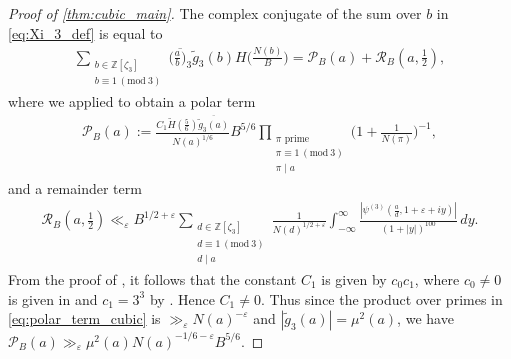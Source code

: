 \documentclass[12pt,reqno]{amsart}
\numberwithin{equation}{section}
\renewcommand{\pmod}[1]{\, (\mathrm{mod}\ #1)}
\newcommand{\Z}{\mathbb{Z}}
\begin{document}
\begin{proof}[Proof of \cref{thm:cubic_main}]
    The complex conjugate of the sum over $b$ in \eqref{eq:Xi_3_def} is equal to
    \begin{align}\label{eq:b_sum_cubic}
        \sum_{\substack{ b \in \mathbb{Z}[\zeta_3] \\ b \equiv 1 \pmod{3}}}  \overline{\Big(\frac{a}{b}\Big)_3} \widetilde{g}_3(b) H\Big(\frac{N(b)}{B}\Big) =  \mathcal{P}_B(a)  + \mathcal{R}_B(a, \tfrac{1}{2}),
    \end{align}
    where we applied \cite[Lemma 6.7]{DDDS24} to obtain a polar term
    \begin{align}\label{eq:polar_term_cubic}
        \mathcal{P}_B(a) := \frac{C_1 \widetilde{H}(\tfrac{5}{6})\overline{\widetilde{g}_3(a)}}{N(a)^{1/6}} B^{5/6} \prod_{\substack{\pi \text{ prime} \\ \pi\equiv 1 \pmod{3} \\ \pi \mid a}} \Big(1 + \frac{1}{N(\pi)} \Big)^{-1},
    \end{align}
    and a remainder term
    \begin{align}\label{eq:remainder_term_cubic}
        \mathcal{R}_B(a, \tfrac{1}{2}) \ll_{\varepsilon} B^{1/2+\varepsilon} \sum_{\substack{d \in \Z[\zeta_3] \\ d\equiv 1\pmod{3} \\ d\mid a}} \frac{1}{N(d)^{1/2+\varepsilon}} \int_{-\infty}^\infty \frac{|\psi^{(3)}(\frac{a}{d}, 1+\varepsilon +iy)|}{(1+|y|)^{100}} \, dy.
    \end{align}
    From the proof of \cite[Lemma 6.7]{DDDS24}, it follows that the constant $C_1$ is given by $c_0 c_1$, where $c_0 \neq 0$ is given in \cite[(6.10)]{DDDS24} and $c_1 = 3^3$ by \cite[(6.8)]{DDDS24}. Hence $C_1 \neq 0$. Thus since the product over primes in \eqref{eq:polar_term_cubic} is $\gg_\varepsilon N(a)^{-\varepsilon}$ and $|{\widetilde{g}_3(a)}| = \mu^2(a)$, we have $\mathcal{P}_B(a) \gg_\varepsilon \mu^2(a) N(a)^{-1/6-\varepsilon} B^{5/6}$.


\end{proof}
\end{document}
